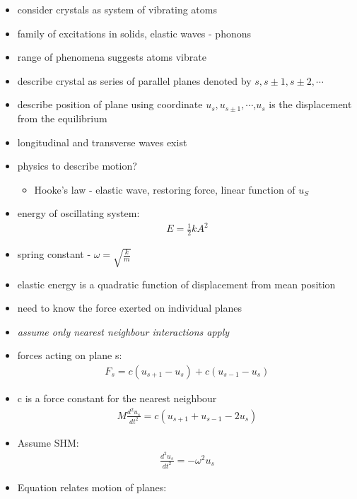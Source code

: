 \documentclass[a4paper,11pt,normalem]{article}
\begin{document}
\begin{itemize}
    \item consider crystals as system of vibrating atoms
    \item family of excitations in solids, elastic waves - phonons
    \item range of phenomena suggests atoms vibrate
    \item describe crystal as series of parallel planes denoted by \(s,s\pm1,s\pm2,\cdots\)
    \item describe position of plane using coordinate \(u_s,u_{s\pm1},\cdots\),\(u_s\) is the displacement from the equilibrium
    \item longitudinal and transverse waves exist
    \item physics to describe motion?
        \begin{itemize}
            \item Hooke's law - elastic wave, restoring force, linear function of \(u_S\)
        \end{itemize}
    \item energy of oscillating system:
        \begin{align*}
            E = \frac{1}{2}kA^2
        \end{align*}
    \item spring constant - \(\omega = \sqrt{\frac{k}{m}}\)
    \item elastic energy is a quadratic function of displacement from mean position
    \item need to know the force exerted on individual planes
    \item \emph{assume only nearest neighbour interactions apply}
    \item forces acting on plane s:
        \begin{align*}
            F_s = c(u_{s+1}-u_s) + c(u_{s-1}-u_s)
        \end{align*}
    \item c is a force constant for the nearest neighbour
        \begin{align*}
            M\frac{d^2u_s}{dt^2} = c(u_{s+1}+u_{s-1}-2u_s)
        \end{align*}
    \item Assume SHM:
        \begin{align*}
            \frac{d^2u_s}{dt^2} = -\omega^2u_s
        \end{align*}
    \item Equation relates motion of planes:
        \begin{align*}

\end{align*}
\end{itemize}
\end{document}
